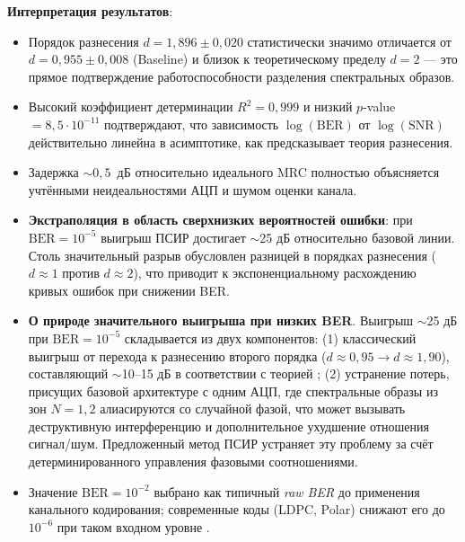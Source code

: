 \documentclass[a4paper,12pt]{article}
\numberwithin{equation}{section}
\begin{document}
\textbf{Интерпретация результатов}:
\begin{itemize}
    \item Порядок разнесения $d = 1{,}896 \pm 0{,}020$ статистически значимо отличается от $d = 0{,}955 \pm 0{,}008$ (Baseline) и близок к теоретическому пределу $d = 2$ --- это прямое подтверждение работоспособности разделения спектральных образов.
    \item Высокий коэффициент детерминации $R^2 = 0{,}999$ и низкий $p$-value $= 8{,}5\cdot10^{-11}$ подтверждают, что зависимость $\log(\text{BER})$ от $\log(\text{SNR})$ действительно линейна в асимптотике, как предсказывает теория разнесения.
    \item Задержка $\sim 0{,}5$~дБ относительно идеального MRC полностью объясняется учтёнными неидеальностями АЦП и шумом оценки канала.
    \item \textbf{Экстраполяция в область сверхнизких вероятностей ошибки}: при $\text{BER}=10^{-5}$ выигрыш ПСИР достигает $\sim$25 дБ относительно базовой линии. Столь значительный разрыв обусловлен разницей в порядках разнесения ($d \approx 1$ против $d \approx 2$), что приводит к экспоненциальному расхождению кривых ошибок при снижении BER.

    \item \textbf{О природе значительного выигрыша при низких BER}. 
    Выигрыш $\sim$25 дБ при $\text{BER}=10^{-5}$ складывается из двух компонентов: 
    (1) классический выигрыш от перехода к разнесению второго порядка 
    ($d \approx 0{,}95 \to d \approx 1{,}90$), составляющий $\sim$10--15 дБ 
    в соответствии с теорией \cite{proakis,goldsmith}; 
    (2) устранение потерь, присущих базовой архитектуре с одним АЦП, 
    где спектральные образы из зон $N=1,2$ алиасируются со случайной фазой, 
    что может вызывать деструктивную интерференцию и дополнительное ухудшение 
    отношения сигнал/шум. Предложенный метод ПСИР устраняет эту проблему 
    за счёт детерминированного управления фазовыми соотношениями.
    
    \item Значение $\text{BER} = 10^{-2}$ выбрано как типичный \textit{raw BER} до применения канального кодирования; современные коды (LDPC, Polar) снижают его до $10^{-6}$ при таком входном уровне \cite{3gpp}.


\end{itemize}
\end{document}
